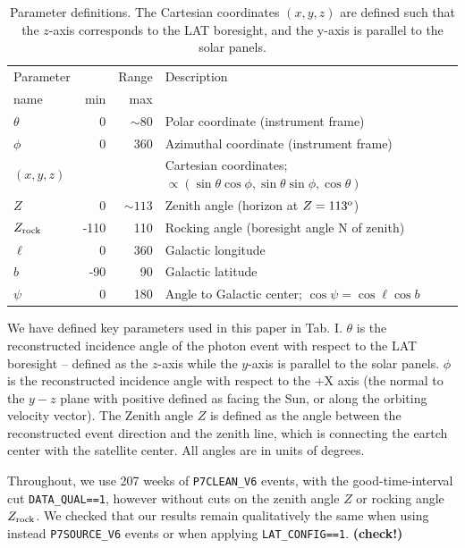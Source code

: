 \documentclass[aps,twocolumn,prd,superscriptaddress,showpacs,nofootinbib,fixfloat]{revtex4}
\newcommand{\degree}{^{\rm o}}
\newcommand{\zrock}{$Z_{\rm rock}$}
\begin{document}
\begin{table}
\begin{center}
  \begin{tabular}{l|rr|l}
    \hline
    Parameter & & Range &  Description\\
    name      & min & max &            \\
    \hline
    $\theta$ &    0 &  $\sim80$ & Polar coordinate (instrument frame) \\
    $\phi$   &    0 &       360 & Azimuthal coordinate (instrument frame) \\
    $(x,y,z)$&      &     & Cartesian coordinates;
    $\propto(\sin\theta\cos\phi, \sin\theta\sin\phi, \cos\theta)$\\
    $Z$      &    0 & $\sim113$ & Zenith angle (horizon at $Z=113\degree$) \\
    \zrock\  & -110 & 110 & Rocking angle (boresight angle N of zenith) \\
    $\ell$   &    0 & 360 & Galactic longitude \\
    $b$      &  -90 &  90 & Galactic latitude \\
    $\psi$   &    0 & 180 & Angle to Galactic center; $\cos\psi=\cos\ell\cos b$ \\
    \hline
  \end{tabular}
  \caption{Parameter definitions. The Cartesian coordinates $(x, y, z)$ are
  defined such that the $z$-axis corresponds to the LAT boresight, and the
  y-axis is parallel to the solar panels.}
  \label{tab:eventRatios}
\end{center}
\end{table}


We have defined key parameters used in this paper in
Tab. I. $\theta$ is the reconstructed
incidence angle of the photon event with respect to the LAT
boresight -- defined as the $z$-axis while the $y$-axis is
parallel to the solar panels. $\phi$ is the reconstructed
incidence angle with respect to the +X axis (the normal to
the $y-z$ plane with positive defined as facing the Sun, or
along the orbiting velocity vector). The Zenith angle $Z$ is
defined as the angle between the reconstructed event
direction and the zenith line, which is connecting the
eartch center with the satellite center. All angles are in
units of degrees.


Throughout, we use 207 weeks of \texttt{P7CLEAN\_V6} events,
with the good-time-interval cut \texttt{DATA\_QUAL==1},
however without cuts on the zenith angle $Z$ or rocking
angle \zrock. We checked that our results remain
qualitatively the same when using instead
\texttt{P7SOURCE\_V6} events or when applying
\texttt{LAT\_CONFIG==1}. \textbf{(check!)}
\end{document}
